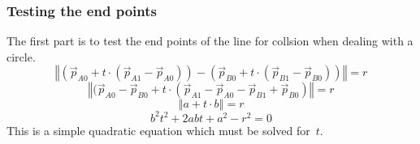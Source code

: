 \documentclass[a4paper,10pt]{scrartcl}
\newcommand{\norm}[1]{\left\Vert {#1} \right\Vert}
\begin{document}
\subsubsection{Testing the end points}
The first part is to test the end points of the line for collsion when dealing with a
circle.\\
\begin{equation}
    \norm{
      (\vec{p}_{A0} + t\cdot (\vec{p}_{A1} - \vec{p}_{A0})) -
      (\vec{p}_{B0} + t\cdot (\vec{p}_{B1} - \vec{p}_{B0}))
    }
    = r
\end{equation}
\begin{equation}
    \norm{
      (\vec{p}_{A0}-\vec{p}_{B0} + t\cdot
      (\vec{p}_{A1} - \vec{p}_{A0} - \vec{p}_{B1} + \vec{p}_{B0})
    }
    = r
\end{equation}
\begin{equation}
    \norm{ a + t\cdot b } = r
\end{equation}
\begin{equation}
    b^2 t^2 + 2abt + a^2-r^2 = 0
\end{equation}
This is a simple quadratic equation which must be solved for~$t$.
\end{document}
